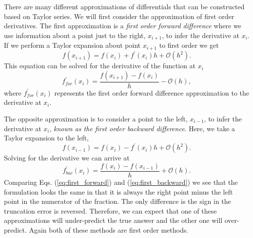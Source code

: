 
There are many different approximations of differentials that can be constructed based
on Taylor series.  We will first consider the approximation of first order derivatives.
The first approximation is a \emph{first order forward difference} where we use information 
about a point just to the right, $x_{i+1}$, to infer the derivative at $x_{i}$.  If we 
perform a Taylor expansion about point $x_{i+1}$ to first order we get
\begin{equation}
     f\left(x_{i+1}\right) = f\left(x_{i}\right) + f^{\prime}\left(x_{i}\right)h + \mathcal{O}\left(h^{2}\right).
\end{equation}
This equation can be solved for the derivative of the function at $x_{i}$ 
\begin{equation}
     f^{\prime}_{for}\left(x_{i}\right) = \frac{f\left(x_{i+1}\right) - f\left(x_{i}\right)}{h} - \mathcal{O}\left(h\right),
  \label{eq:first_forward}
\end{equation}
where $f^{\prime}_{for}\left(x_{i}\right)$ represents the first order forward difference approximation to the derivative at
$x_{i}$.
\par
The opposite approximation is to consider a point to the left, $x_{i-1}$, to infer the
derivative at $x_{i}$, \emph{known as the first order backward difference}. Here, we take a Taylor expansion to the left,
\begin{equation}
     f\left(x_{i-1}\right) = f\left(x_{i}\right) - f^{\prime}\left(x_{i}\right)h + \mathcal{O}\left(h^{2}\right).
\end{equation}
Solving for the derivative we can arrive at
\begin{equation}
     f^{\prime}_{bac}\left(x_{i}\right) = \frac{f\left(x_{i}\right) - f\left(x_{i-1}\right)}{h} + \mathcal{O}\left(h\right).
  \label{eq:first_backward}
\end{equation}
Comparing Eqs. (\ref{eq:first_forward}) and (\ref{eq:first_backward}) we see that the formulation looks the same in that it
is always the right point minus the left point in the numerator of the fraction. The only difference is the sign in the 
truncation error is reversed. Therefore, we can expect that one of these approximations will under-predict the true answer
and the other one will over-predict. Again both of these methods are first order methods.
\par 

